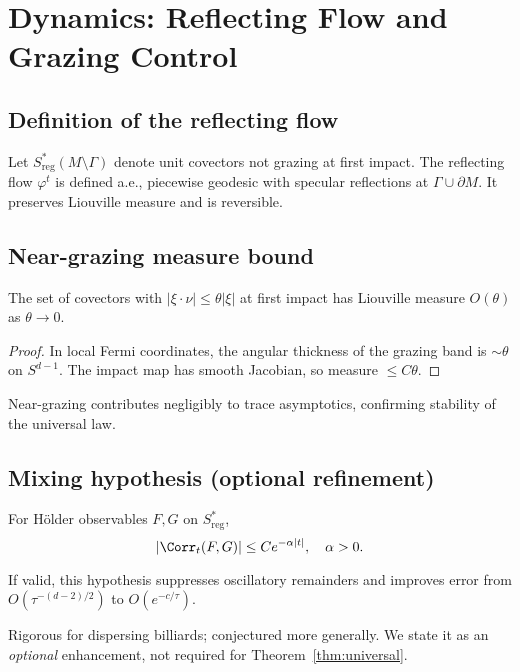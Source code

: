 \section{Dynamics: Reflecting Flow and Grazing Control}
\label{sec:dynamics}

\subsection{Definition of the reflecting flow}
Let $S^*_{\mathrm{reg}}(M\setminus\Gamma)$ denote unit covectors not grazing at first impact. The reflecting flow $\varphi^t$ is defined a.e., piecewise geodesic with specular reflections at $\Gamma\cup\partial M$. It preserves Liouville measure and is reversible.

\subsection{Near-grazing measure bound}
\begin{lemma}\label{lem:grazing}
The set of covectors with $|\xi\cdot\nu|\le\theta|\xi|$ at first impact has Liouville measure $O(\theta)$ as $\theta\to 0$.
\end{lemma}

\begin{proof}
In local Fermi coordinates, the angular thickness of the grazing band is $\sim\theta$ on $S^{d-1}$. The impact map has smooth Jacobian, so measure $\le C\theta$.
\end{proof}

\begin{remark}[Implication]
Near-grazing contributes negligibly to trace asymptotics, confirming stability of the universal law.
\end{remark}

\subsection{Mixing hypothesis (optional refinement)}
\begin{hypothesis}\label{hyp:mix}
For Hölder observables $F,G$ on $S^*_{\mathrm{reg}}$,
\[
|\Corr_t(F,G)|\le Ce^{-\alpha|t|},\quad \alpha>0.
\]
\end{hypothesis}

If valid, this hypothesis suppresses oscillatory remainders and improves error from $O(\tau^{-(d-2)/2})$ to $O(e^{-c/\tau})$.

\begin{remark}
Rigorous for dispersing billiards; conjectured more generally. We state it as an \emph{optional} enhancement, not required for Theorem~\ref{thm:universal}.
\end{remark}

